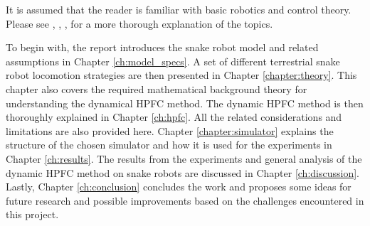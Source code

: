 It is assumed that the reader is familiar with basic robotics and control theory. Please see \cite{lynch2017modern}, \cite{lynch2017modernCompTorque}, \cite{waldron2016kinematics}, \cite{liljeback2012snake} for a more thorough explanation of the topics.

To begin with, the report introduces the snake robot model and related assumptions in Chapter \ref{ch:model_specs}. A set of different terrestrial snake robot locomotion strategies are then presented in Chapter \ref{chapter:theory}. This chapter also covers the required mathematical background theory for understanding the dynamical HPFC method. The dynamic HPFC method is then thoroughly explained in Chapter \ref{ch:hpfc}. All the related considerations and limitations are also provided here. Chapter \ref{chapter:simulator} explains the structure of the chosen simulator and how it is used for the experiments in Chapter \ref{ch:results}. The results from the experiments and general analysis of the dynamic HPFC method on snake robots are discussed in Chapter \ref{ch:discussion}. Lastly, Chapter \ref{ch:conclusion} concludes the work and proposes some ideas for future research and possible improvements based on the challenges encountered in this project.